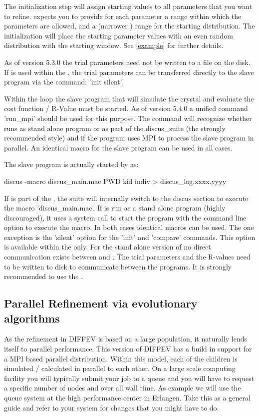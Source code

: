 The initialization step will assign starting values to all parameters that you
want to refine. \Diffev expects you to provide for each parameter a range 
within which the parameters are allowed, and a (narrower ) range for the 
starting distribution. The initialization will place the starting parameter 
values with an even random distribution with the starting window. See
\ref{example} for further details. 

As of version  5.3.0 the trial parameters need not be written to a file on
the disk. If \Diffev is used within the \suite, the trial parameters
can be transferred directly to the slave program via the command:
'init silent'.

Within the loop the slave program that will simulate the crystal and evaluate
the cost function / R-Value must be started. As of version 5.4.0 a unified
command 'run\_mpi' should be used for this purpose. The command will 
recognize whether \Diffev runs as stand alone program or as part of the
discus\_suite (the strongly recommended style) and if the program uses MPI to 
process the slave program in parallel. An identical macro for the slave 
program can be used in all cases. 

The slave program is actually started 
by \Diffev as:
\begin{MacVerbatim}
discus -macro discus_main.mac PWD kid indiv > discus_log.xxxx.yyyy
\end{MacVerbatim}

If \Diffev is part of the \suite, the suite will internally switch to
the discus section to execute the macro 'discus\_main.mac'. If \Diffev is
run as a stand alone program (highly discouraged), it uses a system 
call to start the \Discus 
program with the command line option to execute the macro. In both cases
identical \Discus macros can be used. The one exception is the 'silent'
option for the 'init' and 'compare' commands. This option is available
within the \Suite only. For the stand alone version of \Diffev no direct
communication exists between \Diffev and \discus. The trial parameters and
the R-values need to be written to disk to communicate between the 
programs. It is strongly recommended to use the \suite.

\subsection{Parallel Refinement via evolutionary algorithms \label{diff-parallel}}

As the refinement in DIFFEV is based on a large population, it 
naturally lends itself to parallel performance. This version of DIFFEV has a 
build in support for a MPI based parallel distribution. Within this model,
each of the children is simulated / calculated in parallel to each other. 
On a large scale computing facility you will typically submit your job to 
a queue and you will have to request a specific number of nodes and over all
wall time. As example we will use the queue system at the high performance
center in Erlangen. Take this as a general guide and refer to your system
for changes that you might have to do.



